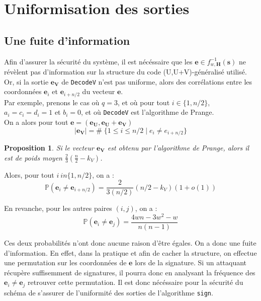 \documentclass[12pt]{article}
\theoremstyle{plain}
\newtheorem{propo}[thm]{Proposition}
\theoremstyle{definition}
\begin{document}
\section{Uniformisation des sorties}

\subsection{Une fuite d'information}
Afin d'assurer la sécurité du système, il est nécéssaire que les $\mathbf{e} \in f_{w,\mathbf{H}}^{-1}(\mathbf{s})$ ne révèlent pas d'information sur la structure du code (U,U+V)-généralisé utilisé. \\
Or, si la sortie $\mathbf{e_V}$ de \verb|DecodeV| n'est pas uniforme, alors des corrélations entre les coordonnées $\mathbf{e}_i$ et $\mathbf{e}_{i+n/2}$ du vecteur $\mathbf{e}$. \\
Par exemple, prenons le cas où $q=3$, et où pour tout $i \in \{1,n/2\}$, $a_i = c_i = d_i = 1$ et $b_i = 0$, et où \verb|DecodeV| est l'algorithme de Prange. \\
On a alors pour tout $\mathbf{e} = (\mathbf{e_U},\mathbf{e_U}+\mathbf{e_V})$
$$ |\mathbf{e_V}| = \# \; \{1  \leq i \leq n/2 \;|\; e_i \neq e_{i+n/2}\}$$

\begin{propo}
Si le vecteur $\mathbf{e_V}$ est obtenu par l'algorithme de Prange, alors il est de poids moyen $\frac{2}{3}(\frac{n}{2}-k_V)$.
\end{propo}

\noindent Alors, pour tout $i \ in \{1,n/2\}$, on a :
$$ \mathbb{P}(\mathbf{e}_i \neq \mathbf{e}_{i+n/2}) = \frac{2}{3(n/2)}(n/2-k_V)(1+o(1))$$

\noindent En revanche, pour les autres paires $(i,j)$, on a :
$$ \mathbb{P}(\mathbf{e}_i \neq \mathbf{e}_{j}) = \frac{4wn - 3w^2-w}{n(n-1)}$$

\noindent Ces deux probabilités n'ont donc aucune raison d'être égales. On a donc une fuite d'information. En effet, dans la pratique et afin de cacher la structure, on effectue une permutation sur les coordonnées de $\mathbf{e}$ lors de la signature. Si un attaquant récupère suffisemment de signatures, il pourra donc en analysant la fréquence des $\mathbf{e}_i \neq \mathbf{e}_j$ retrouver cette permutation. Il est donc nécéssaire pour la sécurité du schéma de s'assurer de l'uniformité des sorties de l'algorithme \verb|sign|.
\end{document}
